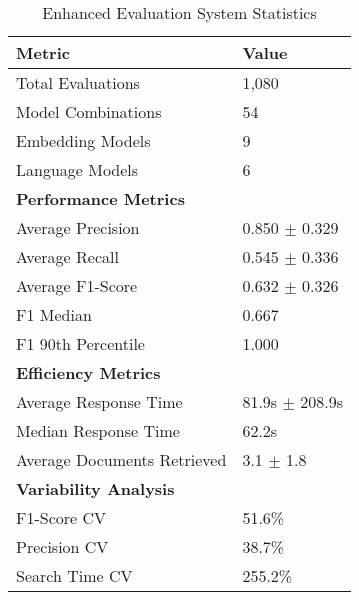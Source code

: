 \begin{table}
\caption{Enhanced Evaluation System Statistics}
\label{tab:enhanced_system_stats}
\begin{tabular}{ll}
\toprule
Metric & Value \\
\midrule
Total Evaluations & 1,080 \\
Model Combinations & 54 \\
Embedding Models & 9 \\
Language Models & 6 \\
\midrule
\textbf{Performance Metrics} & \\
Average Precision & 0.850 $\pm$ 0.329 \\
Average Recall & 0.545 $\pm$ 0.336 \\
Average F1-Score & 0.632 $\pm$ 0.326 \\
F1 Median & 0.667 \\
F1 90th Percentile & 1.000 \\
\midrule
\textbf{Efficiency Metrics} & \\
Average Response Time & 81.9s $\pm$ 208.9s \\
Median Response Time & 62.2s \\
Average Documents Retrieved & 3.1 $\pm$ 1.8 \\
\midrule
\textbf{Variability Analysis} & \\
F1-Score CV & 51.6\% \\
Precision CV & 38.7\% \\
Search Time CV & 255.2\% \\
\bottomrule
\end{tabular}
\end{table}